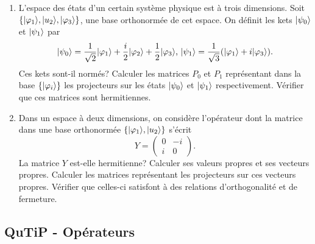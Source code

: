 \begin{enumerate}
\item L'espace des états d'un certain système physique est à trois dimensions.
Soit $\{\vert\varphi_1\rangle, \vert u_{2}\rangle, \vert\varphi_3\rangle\}$, une base
orthonormée de cet espace. On définit les kets $\vert\psi_{0}\rangle$ et
$\vert\psi_1\rangle$ par
\begin{equation}
\vert\psi_{0}\rangle=\frac{1}{\sqrt{2}}\vert\varphi_1\rangle+\frac{i}{2}\vert\varphi_{2}\rangle
+\frac{1}{2}\vert\varphi_3\rangle \text{, }\vert\psi_1\rangle=\frac{1}{\sqrt{3}}(
\vert\varphi_1\rangle+i\vert\varphi_3\rangle).
\end{equation}
Ces kets sont-il normés? Calculer les matrices $P_{0}$ et $P_1$ représentant
dans la base $\{\vert\varphi_{i}\rangle\}$ les projecteurs sur les états
$\vert\psi_{0}\rangle$ et $\vert\psi_1\rangle$ respectivement. Vérifier que ces matrices
sont hermitiennes.

\item Dans un espace à deux dimensions, on considère l'opérateur dont la
matrice dans une base orthonormée $\{\vert\varphi_1\rangle,\vert u_{2}\rangle\}$ s'écrit
\begin{equation}
Y=\begin{pmatrix}
0 & -i\\
i & 0
\end{pmatrix}.
\end{equation}
La matrice $Y$ est-elle hermitienne? Calculer ses valeurs propres et ses
vecteurs propres. Calculer les matrices représentant les projecteurs sur ces
vecteurs propres. Vérifier que celles-ci satisfont à des relations
d'orthogonalité et de fermeture.

\end{enumerate}

\subsection{QuTiP - Opérateurs}

